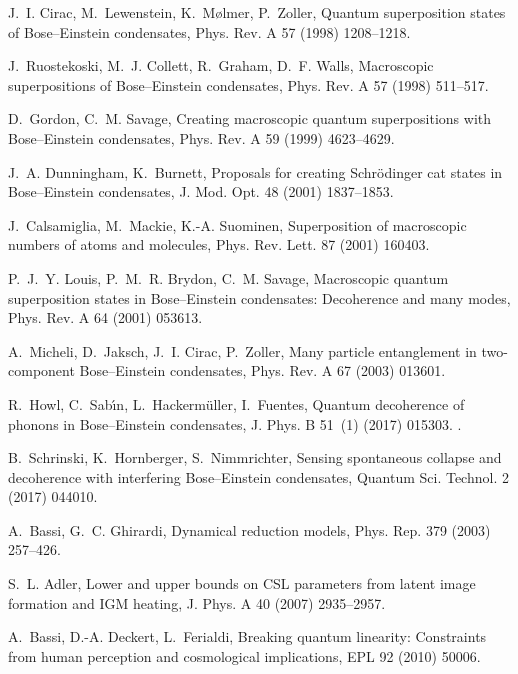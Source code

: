 \documentclass[3p,sort&compress]{elsarticle}
\begin{document}
\begin{thebibliography}{100}
J.~I. Cirac, M.~Lewenstein, K.~M{\o}lmer, P.~Zoller, Quantum superposition
  states of {B}ose--{E}instein condensates, Phys. Rev. A 57 (1998) 1208--1218.

J.~Ruostekoski, M.~J. Collett, R.~Graham, D.~F. Walls, Macroscopic
  superpositions of {B}ose--{E}instein condensates, Phys. Rev. A 57 (1998)
  511--517.

D.~Gordon, C.~M. Savage, Creating macroscopic quantum superpositions with
  {B}ose--{E}instein condensates, Phys. Rev. A 59 (1999) 4623--4629.

J.~A. Dunningham, K.~Burnett, Proposals for creating {S}chr{\"o}dinger cat
  states in {B}ose--{E}instein condensates, J. Mod. Opt. 48 (2001) 1837--1853.

J.~Calsamiglia, M.~Mackie, K.-A. Suominen, Superposition of macroscopic numbers
  of atoms and molecules, Phys. Rev. Lett. 87 (2001) 160403.

P.~J.~Y. Louis, P.~M.~R. Brydon, C.~M. Savage, Macroscopic quantum
  superposition states in {B}ose--{E}instein condensates: Decoherence and many
  modes, Phys. Rev. A 64 (2001) 053613.

A.~Micheli, D.~Jaksch, J.~I. Cirac, P.~Zoller, Many particle entanglement in
  two-component {B}ose--{E}instein condensates, Phys. Rev. A 67 (2003) 013601.

R.~Howl, C.~Sab{\'{\i}}n, L.~Hackerm{\"u}ller, I.~Fuentes, Quantum decoherence
  of phonons in {B}ose--{E}instein condensates, J. Phys. B 51~(1) (2017)
  015303.
\newblock \href {http://dx.doi.org/10.1088/1361-6455/aa9622}
  {}.

B.~Schrinski, K.~Hornberger, S.~Nimmrichter, Sensing spontaneous collapse and
  decoherence with interfering {B}ose--{E}instein condensates, Quantum Sci.
  Technol. 2 (2017) 044010.

A.~Bassi, G.~C. Ghirardi, Dynamical reduction models, Phys. Rep. 379 (2003)
  257--426.

S.~L. Adler, Lower and upper bounds on {CSL} parameters from latent image
  formation and {IGM} heating, J. Phys. A 40 (2007) 2935--2957.

A.~Bassi, D.-A. Deckert, L.~Ferialdi, Breaking quantum linearity: {C}onstraints
  from human perception and cosmological implications, EPL 92 (2010) 50006.


\end{thebibliography}
\end{document}

